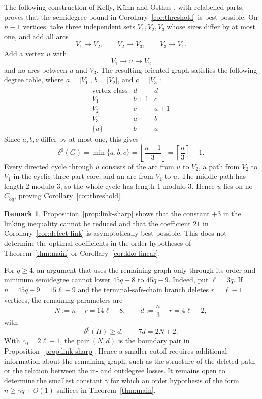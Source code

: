 \documentclass[11pt]{amsart}
\theoremstyle{definition}
\newtheorem{remark}[theorem]{Remark}
\begin{document}
The following construction of Kelly, K\"uhn and Osthus
\cite[discussion following Theorem~4]{KKO}, with relabelled parts,
proves that the semidegree bound
in Corollary~\ref{cor:threshold} is best possible.
On $n-1$ vertices, take three independent sets $V_1,V_2,V_3$ whose
sizes differ by at most one, and add all arcs
\[
  V_1\to V_2,\qquad V_2\to V_3,
  \qquad V_3\to V_1.
\]
Add a vertex $u$ with
\[
  V_1\to u\to V_2
\]
and no arcs between $u$ and $V_3$.  The resulting oriented graph satisfies
the following degree table, where $a=|V_1|$, $b=|V_2|$, and
$c=|V_3|$:
\[
\begin{array}{c|cc}
\text{vertex class}&d^+&d^-\\ \hline
V_1&b+1&c\\
V_2&c&a+1\\
V_3&a&b\\
\{u\}&b&a
\end{array}
\]
Since $a,b,c$ differ by at most one, this gives
\[
  \delta^0(G)
  =\min\{a,b,c\}
  =\left\lfloor\frac{n-1}{3}\right\rfloor
  =\left\lceil\frac n3\right\rceil-1.
\]
Every directed cycle through $u$ consists of the arc from $u$ to $V_2$, a path from $V_2$ to $V_1$ in the cyclic three-part core, and an arc from $V_1$ to $u$.  The middle path has length $2$ modulo $3$, so the whole cycle has length $1$ modulo $3$.  Hence $u$ lies on no $C_{3q}$, proving Corollary~\ref{cor:threshold}.

\begin{remark}
Proposition~\ref{prop:link-sharp} shows that the constant $+3$ in the
linking inequality cannot be reduced and that the coefficient $21$ in
Corollary~\ref{cor:defect-link} is asymptotically best possible.  This
does not determine the optimal coefficients in the order hypotheses of
Theorem~\ref{thm:main} or Corollary~\ref{cor:kko-linear}.

For $q\ge4$, an argument that uses the remaining graph only through its
order and minimum semidegree cannot lower $45q-8$ to $45q-9$.  Indeed,
put $\ell=3q$.  If $n=45q-9=15\ell-9$ and the terminal-safe-chain
branch deletes $r=\ell-1$ vertices, the remaining parameters are
\[
  N:=n-r=14\ell-8,\qquad
  d:=\frac n3-r=4\ell-2,
\]
with
\[
  \delta^0(H)\ge d,\qquad 7d=2N+2.
\]
With $c_0=2\ell-1$, the pair $(N,d)$ is the boundary pair in
Proposition~\ref{prop:link-sharp}.  Hence a smaller cutoff requires
additional information about the remaining graph, such as the
structure of the deleted path or the relation between the in- and
outdegree losses.
It remains open to determine the smallest constant $\gamma$ for which
an order hypothesis of the form $n\ge\gamma q+O(1)$ suffices in
Theorem~\ref{thm:main}.
\end{remark}
\end{document}
